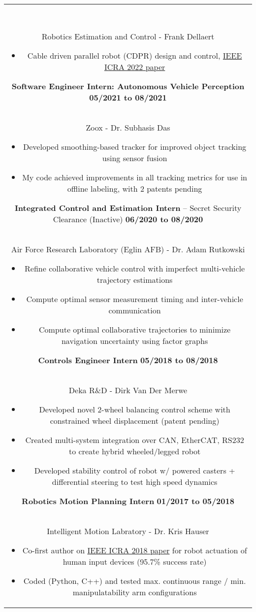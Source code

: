 \documentclass[11pt]{amsart}
\newcommand*\ruleline[1]{\par\noindent\raisebox{.8ex}{\makebox[\linewidth]{\hrulefill\hspace{1ex}\raisebox{-.8ex}{\Large~#1~}\hspace{1ex}\hrulefill}}\\ \-\ \vspace{-1em}}
\begin{document}
\begin{center}
\begin{tabular}{c}
	\ruleline{Work History}
	\begin{minipage}{\textwidth}
		{\bf PhD Research Assistant} \hfill {\bf 08/2019 to Present}\\
		{Robotics Estimation and Control - Frank Dellaert}
		\begin{itemize}
			\item Cable driven parallel robot (CDPR) design and control, \href{https://arxiv.org/abs/2109.06238}{IEEE ICRA 2022 paper}
		\end{itemize}
		{\bf Software Engineer Intern: Autonomous Vehicle Perception} \hfill {\bf 05/2021 to 08/2021} \\
		{Zoox - Dr. Subhasis Das}
		\begin{itemize}
			\item Developed smoothing-based tracker for improved object tracking using sensor fusion
			\item My code achieved improvements in all tracking metrics for use in offline labeling, with 2 patents pending
		\end{itemize}
		{\bf Integrated Control and Estimation Intern} -- Secret Security Clearance (Inactive) \hfill {\bf 06/2020 to 08/2020} \\
		{Air Force Research Laboratory (Eglin AFB) - Dr. Adam Rutkowski}
		\begin{itemize}
			\item Refine collaborative vehicle control with imperfect multi-vehicle trajectory estimations
			\item Compute optimal sensor measurement timing and inter-vehicle communication
			\item Compute optimal collaborative trajectories to minimize navigation uncertainty using factor graphs
		\end{itemize}
		{\bf Controls Engineer Intern} \hfill {\bf 05/2018 to 08/2018} \\
		{Deka R\&D - Dirk Van Der Merwe}
		\begin{itemize}
			\item Developed novel 2-wheel balancing control scheme with constrained wheel displacement (patent pending)
			\item Created multi-system integration over CAN, EtherCAT, RS232 to create hybrid wheeled/legged robot
			\item Developed stability control of robot w/ powered casters + differential steering to test high speed dynamics
		\end{itemize}
		{\bf Robotics Motion Planning Intern} \hfill {\bf 01/2017 to 05/2018}\\
		{Intelligent Motion Labratory - Dr. Kris Hauser}
		\begin{itemize}
			\item Co-first author on \href{http://doi.org/10.1109/ICRA.2018.8463180}{IEEE ICRA 2018 paper} for robot actuation of human input devices (95.7\% success rate)
			\item Coded (Python, C++) and tested max. continuous range / min. manipulatability arm configurations
		\end{itemize}
		

\end{minipage}
\end{tabular}
\end{center}
\end{document}
